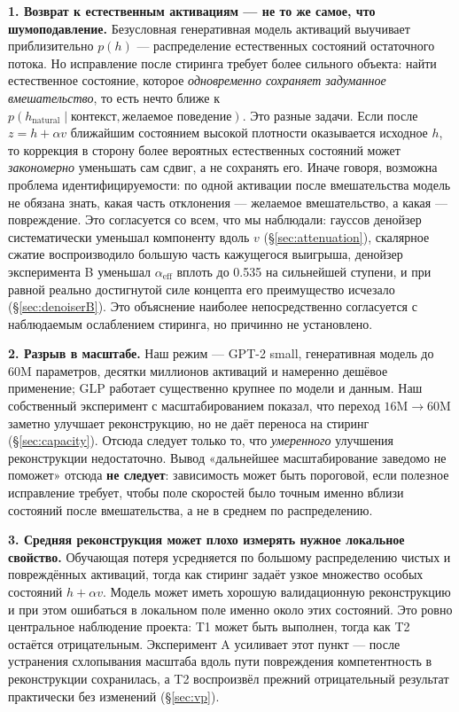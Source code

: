 \documentclass[10pt,a4paper]{article}
\begin{document}
\textbf{1. Возврат к естественным активациям — не то же самое, что шумоподавление.} Безусловная
генеративная модель активаций выучивает приблизительно $p(h)$ — распределение
естественных состояний остаточного потока. Но исправление после стиринга требует
более сильного объекта: найти естественное состояние, которое \emph{одновременно
сохраняет задуманное вмешательство}, то есть нечто ближе к
$p(h_{\mathrm{natural}} \mid \text{контекст}, \text{желаемое поведение})$. Это
разные задачи. Если после $z = h + \alpha v$ ближайшим состоянием высокой
плотности оказывается исходное $h$, то коррекция в сторону более вероятных
естественных состояний может \emph{закономерно} уменьшать сам сдвиг, а не
сохранять его. Иначе говоря, возможна проблема
идентифицируемости: по одной активации после вмешательства модель не обязана знать,
какая часть отклонения — желаемое вмешательство, а какая — повреждение. Это
согласуется со всем, что мы наблюдали: гауссов денойзер систематически уменьшал
компоненту вдоль $v$ (\S\ref{sec:attenuation}), скалярное сжатие воспроизводило
большую часть кажущегося выигрыша, денойзер эксперимента B уменьшал
$\alpha_{\mathrm{eff}}$ вплоть до 0.535 на сильнейшей ступени, и при равной
реально достигнутой силе концепта его преимущество исчезало
(\S\ref{sec:denoiserB}). Это объяснение наиболее непосредственно согласуется с
наблюдаемым ослаблением стиринга, но причинно не установлено.

\textbf{2. Разрыв в масштабе.} Наш режим — GPT-2 small, генеративная модель до
60M параметров, десятки миллионов активаций и намеренно дешёвое применение;
GLP работает существенно крупнее по модели и данным. Наш собственный эксперимент
с масштабированием показал, что переход $16\text{M} \to 60\text{M}$ заметно
улучшает реконструкцию, но не даёт переноса на стиринг (\S\ref{sec:capacity}).
Отсюда следует только то, что \emph{умеренного} улучшения реконструкции
недостаточно. Вывод «дальнейшее масштабирование заведомо не поможет» отсюда
\textbf{не следует}: зависимость может быть пороговой, если полезное исправление
требует, чтобы поле скоростей было точным именно вблизи состояний после
вмешательства,
а не в среднем по распределению.

\textbf{3. Средняя реконструкция может плохо измерять нужное локальное
свойство.} Обучающая потеря усредняется по большому распределению чистых и
повреждённых активаций, тогда как стиринг задаёт узкое множество особых
состояний $h + \alpha v$. Модель может иметь хорошую валидационную реконструкцию
и при этом ошибаться в локальном поле именно около этих состояний. Это ровно
центральное наблюдение проекта: T1 может быть выполнен, тогда как T2 остаётся
отрицательным. Эксперимент A
усиливает этот пункт — после устранения схлопывания масштаба вдоль пути
повреждения компетентность в реконструкции сохранилась, а T2 воспроизвёл прежний
отрицательный результат практически без изменений (\S\ref{sec:vp}).
\end{document}
